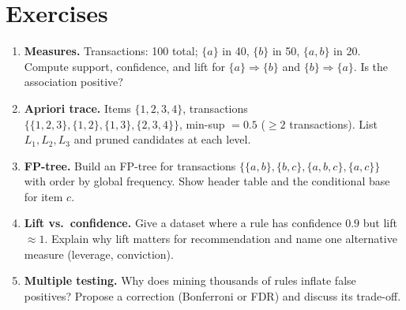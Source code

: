 \section{Exercises}
\begin{enumerate}[label=E6.\arabic*, leftmargin=*, itemsep=0.6em]
    \item \textbf{Measures.} Transactions: 100 total; $\{a\}$ in 40, $\{b\}$ in 50, $\{a,b\}$ in 20. Compute support, confidence, and lift for $\{a\}\Rightarrow\{b\}$ and $\{b\}\Rightarrow\{a\}$. Is the association positive?
    \item \textbf{Apriori trace.} Items $\{1,2,3,4\}$, transactions $\{\{1,2,3\},\{1,2\},\{1,3\},\{2,3,4\}\}$, min-sup $=0.5$ ($\ge2$ transactions). List $L_1,L_2,L_3$ and pruned candidates at each level.
    \item \textbf{FP-tree.} Build an FP-tree for transactions $\{\{a,b\},\{b,c\},\{a,b,c\},\{a,c\}\}$ with order by global frequency. Show header table and the conditional base for item $c$.
    \item \textbf{Lift vs.\ confidence.} Give a dataset where a rule has confidence $0.9$ but lift $\approx1$. Explain why lift matters for recommendation and name one alternative measure (leverage, conviction).
    \item \textbf{Multiple testing.} Why does mining thousands of rules inflate false positives? Propose a correction (Bonferroni or FDR) and discuss its trade-off.
\end{enumerate}
